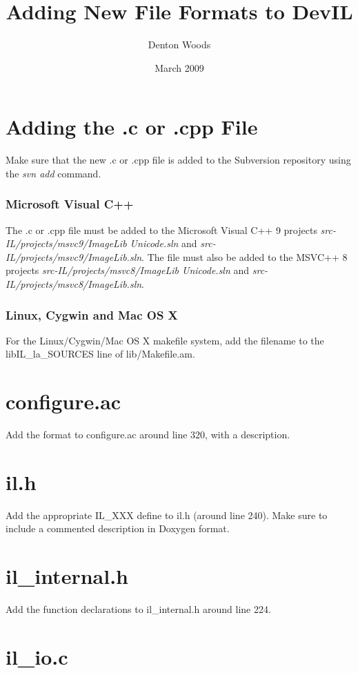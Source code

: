 \documentclass[letterpaper,10pt]{article}
\title{Adding New File Formats to DevIL}
\author{Denton Woods}
\date{March 2009}
\begin{document}
\maketitle

\section*{Adding the .c or .cpp File}
Make sure that the new .c or .cpp file is added to the Subversion repository using the \emph{svn add} command.

\subsubsection*{Microsoft Visual C++}
The .c or .cpp file must be added to the Microsoft Visual C++ 9 projects \emph{src-IL/projects/msvc9/ImageLib Unicode.sln} and \emph{src-IL/projects/msvc9/ImageLib.sln}.  The file must also be added to the MSVC++ 8 projects \emph{src-IL/projects/msvc8/ImageLib Unicode.sln} and \emph{src-IL/projects/msvc8/ImageLib.sln}.

\subsubsection*{Linux, Cygwin and Mac OS X}
For the Linux/Cygwin/Mac OS X makefile system, add the filename to the libIL\_la\_SOURCES line of lib/Makefile.am.


\section*{configure.ac}
Add the format to configure.ac around line 320, with a description.


\section*{il.h}
Add the appropriate IL\_XXX define to il.h (around line 240).  Make sure to include a commented description in Doxygen format.


\section*{il\_internal.h}
Add the function declarations to il\_internal.h around line 224.


\section*{il\_io.c}
\end{document}
